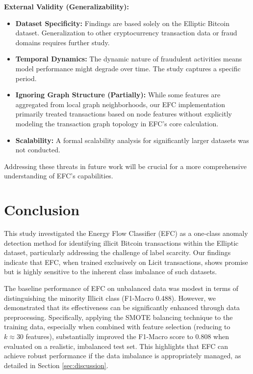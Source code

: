 \documentclass[12pt]{article}
\begin{document}
\textbf{External Validity (Generalizability):}
\begin{itemize}
    \item \textbf{Dataset Specificity:} Findings are based solely on the Elliptic Bitcoin dataset. Generalization to other
    cryptocurrency transaction data or fraud domains requires further study.
    \item \textbf{Temporal Dynamics:} The dynamic nature of fraudulent activities means model performance might degrade
    over time. The study captures a specific period.
    \item \textbf{Ignoring Graph Structure (Partially):} While some features are aggregated from local graph neighborhoods,
    our EFC implementation primarily treated transactions based on node features without explicitly modeling the transaction
    graph topology in EFC's core calculation.
    \item \textbf{Scalability:} A formal scalability analysis for significantly larger datasets was not conducted.
\end{itemize}
Addressing these threats in future work will be crucial for a more comprehensive understanding of EFC's capabilities.

\section{Conclusion} \label{section:conclusion}

This study investigated the Energy Flow Classifier (EFC) as a one-class anomaly detection method for identifying illicit
Bitcoin transactions within the Elliptic dataset, particularly addressing the challenge of label scarcity. Our findings
indicate that EFC, when trained exclusively on Licit transactions, shows promise but is highly sensitive to the inherent
class imbalance of such datasets.

The baseline performance of EFC on unbalanced data was modest in terms of distinguishing the minority Illicit class
(F1-Macro 0.488). However, we demonstrated that its effectiveness can be significantly enhanced through data preprocessing.
Specifically, applying the SMOTE balancing technique to the training data, especially when combined with feature selection
(reducing to $k \approx 30$ features), substantially improved the F1-Macro score to 0.808 when evaluated on a realistic,
imbalanced test set. This highlights that EFC can achieve robust performance if the data imbalance is appropriately managed,
as detailed in Section \ref{sec:discussion}.
\end{document}
